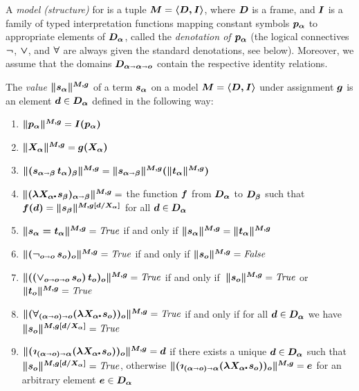 \begin{definition}\label{holmodel}
  A \emph{model (structure)} for \HOL is a tuple $\boldsymbol{M}=\boldsymbol{\langle D, I \rangle}$, where
  $\boldsymbol{D}$ is a frame, and $\boldsymbol{I}$ is a family of typed interpretation
  functions mapping constant symbols $\boldsymbol{p_\alpha}$ to appropriate
  elements of $\boldsymbol{D_\alpha}$, called the \emph{denotation of $\boldsymbol{p_\alpha}$}
  (the logical connectives $\boldsymbol{\neg}$, $\boldsymbol{\vee}$, and $\boldsymbol{\forall}$ are always
  given the standard denotations, see below).  Moreover, we assume that the domains
  $\boldsymbol{D_{\alpha\shortrightarrow\alpha\shortrightarrow o}}$ contain the respective identity relations.
\end{definition}


\begin{definition}\label{holvalue}
  The \emph{value} $\boldsymbol{\| s_\alpha\|^{M,g}}$ of a \HOL term
  $\boldsymbol{s_\alpha}$ on a model $\boldsymbol{M}=\boldsymbol{\langle D, I \rangle}$ under assignment $\boldsymbol{g}$ is an element $\boldsymbol{d}\in \boldsymbol{D_\alpha}$
  defined in the following way:
\begin{enumerate}
\item $\boldsymbol{\|p_\alpha\|^{M,g}} = \boldsymbol{I(p_\alpha)}$ 
\item $\boldsymbol{\|X_\alpha\|^{M,g}} = \boldsymbol{g(X_\alpha)}$
\item $\boldsymbol{\|(s_{\alpha\shortrightarrow\beta}\, t_\alpha)_\beta\|^{M,g}} = \boldsymbol{\|s_{\alpha\shortrightarrow\beta}\|^{M,g}(\|t_\alpha\|^{M,g})}$
\item $\hol{\|(\lam{X_\alpha}s_\beta)_{\alpha\ar\beta}\|^{M,g}} = $
  the function $\boldsymbol{f}$ from $\boldsymbol{D_\alpha}$ to $\boldsymbol{D_\beta}$ such
  that $\boldsymbol{f(d)} = \boldsymbol{\|s_\beta\|^{M,g[d/X_\alpha]}}$ for all
  $\boldsymbol{d}\in \boldsymbol{D_\alpha}$
\item $\boldsymbol{\|s_\alpha = t_\alpha\|^{M,g}} = {\mathit{True}}$ if and only if $\boldsymbol{\|s_\alpha\|^{M,g}} = \boldsymbol{\|t_\alpha\|^{M,g}} $
\item $\boldsymbol{\|(\neg_{o\shortrightarrow o}\, s_o)_o\|^{M,g}} = {\mathit{True}}$ if and only if $\boldsymbol{\|s_o\|^{M,g}} = {\mathit{False}}$
\item \sloppy $\boldsymbol{\|(({\vee_{o\shortrightarrow o\shortrightarrow o}}\,s_o)\,t_o)_o\|^{M,g}} =
  {\mathit{True}}$ if and only if\, $\boldsymbol{\|s_o\|^{M,g}} = {\mathit{True}}$ or $\boldsymbol{\|t_o\|^{M,g}}
  = {\mathit{True}}$
\item \sloppy $\hol{\|(\forall_{(\alpha\ar o)\ar o}(\lam{X_\alpha}
    s_o))_o\|^{M,g}} = {\True}$ if and only if for all $\boldsymbol{d}\in
  \boldsymbol{D_\alpha}$ we have $\boldsymbol{\|s_o\|^{M,g[d/X_\alpha]}} = {\mathit{True}}$
\item $\hol{\|(\Descr_{(\alpha\ar o)\ar \alpha}(\lam{X_\alpha}
    s_o))_o\|^{M,g}} = \hol{d}$ if there exists a unique $\boldsymbol{d}\in \boldsymbol{D_{\alpha}}$ such that
  $\boldsymbol{\|s_o\|^{M,g[d/X_\alpha]}} = {\mathit{True}}$, 
otherwise  $\hol{\|(\Descr_{(\alpha\ar o)\ar \alpha}(\lam{X_\alpha}
    s_o))_o\|^{M,g}} = \hol{e}$ for an arbitrary element $\boldsymbol{e}\in \boldsymbol{D_{\alpha}}$
\end{enumerate}
\end{definition}


